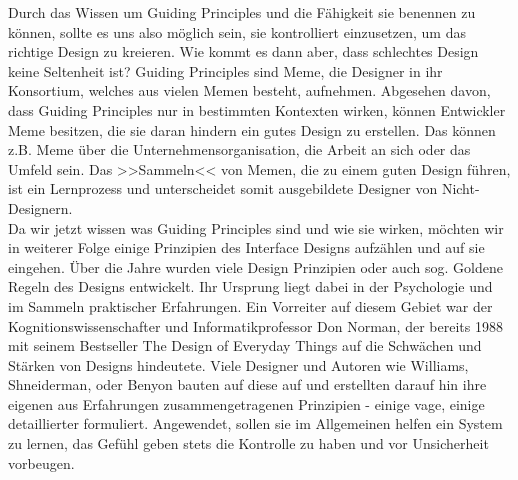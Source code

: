 Durch das Wissen um Guiding Principles und die Fähigkeit sie benennen zu können, sollte es uns also möglich sein, sie kontrolliert einzusetzen, um das richtige Design zu kreieren. Wie kommt es dann aber, dass schlechtes Design keine Seltenheit ist? Guiding Principles sind Meme, die Designer in ihr Konsortium, welches aus vielen Memen besteht, aufnehmen. Abgesehen davon, dass Guiding Principles nur in bestimmten Kontexten wirken, können Entwickler Meme besitzen, die sie daran hindern ein gutes Design zu erstellen. Das können z.B. Meme über die Unternehmensorganisation, die Arbeit an sich oder das Umfeld sein. Das >>Sammeln<< von Memen, die zu einem guten Design führen, ist ein Lernprozess und unterscheidet somit ausgebildete Designer von Nicht- Designern. \\
Da wir jetzt wissen was Guiding Principles sind und wie sie wirken, möchten wir in weiterer Folge einige Prinzipien des Interface Designs aufzählen und auf sie eingehen. Über die Jahre wurden viele Design Prinzipien oder auch sog. Goldene Regeln des Designs entwickelt. Ihr Ursprung liegt dabei in der Psychologie und im Sammeln praktischer Erfahrungen. Ein Vorreiter auf diesem Gebiet war der Kognitionswissenschafter und Informatikprofessor Don Norman, der bereits 1988 mit seinem Bestseller The Design of Everyday Things \citep{Norman:1988} auf die Schwächen und Stärken von Designs hindeutete. Viele Designer und Autoren wie Williams, Shneiderman, oder Benyon bauten auf diese auf und erstellten darauf hin ihre eigenen aus Erfahrungen zusammengetragenen Prinzipien - einige vage, einige detaillierter formuliert. Angewendet, sollen sie im Allgemeinen helfen ein System zu lernen, das Gefühl geben stets die Kontrolle zu haben und vor Unsicherheit vorbeugen.

